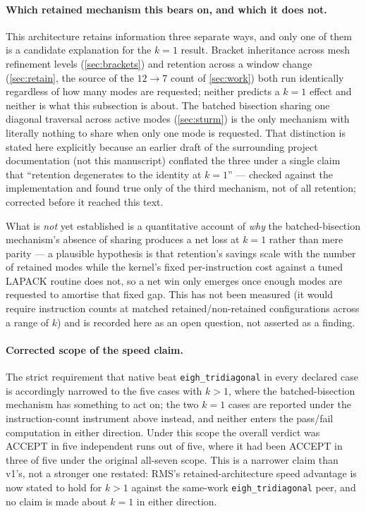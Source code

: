 \documentclass[twocolumn,10pt,a4paper]{article}
\theoremstyle{plain}
\theoremstyle{definition}
\newcommand{\ACCEPT}{\textsf{ACCEPT}}
\begin{document}
\paragraph{Which retained mechanism this bears on, and which it does not.}
This architecture retains information three separate ways, and only one of
them is a candidate explanation for the $k=1$ result. Bracket inheritance
across mesh refinement levels (\cref{sec:brackets}) and retention across a
window change (\cref{sec:retain}, the source of the $12\to7$ count of
\cref{sec:work}) both run identically regardless of how many modes are
requested; neither predicts a $k=1$ effect and neither is what this
subsection is about. The batched bisection sharing one diagonal traversal
across active modes (\cref{sec:sturm}) is the only mechanism with literally
nothing to share when only one mode is requested. That distinction is stated
here explicitly because an earlier draft of the surrounding project
documentation (not this manuscript) conflated the three under a single
claim that ``retention degenerates to the identity at $k=1$'' --- checked
against the implementation and found true only of the third mechanism, not
of all retention; corrected before it reached this text.

What is \emph{not} yet established is a quantitative account of \emph{why}
the batched-bisection mechanism's absence of sharing produces a net loss at
$k=1$ rather than mere parity --- a plausible hypothesis is that retention's
savings scale with the number of retained modes while the kernel's
fixed per-instruction cost against a tuned LAPACK routine does not, so a net
win only emerges once enough modes are requested to amortise that fixed gap.
This has not been measured (it would require instruction counts at matched
retained/non-retained configurations across a range of $k$) and is recorded
here as an open question, not asserted as a finding.

\paragraph{Corrected scope of the speed claim.}
The strict requirement that native beat \texttt{eigh\_tridiagonal} in every
declared case is accordingly narrowed to the five cases with $k>1$, where the
batched-bisection mechanism has something to act on; the two $k=1$ cases are
reported under the instruction-count instrument above instead, and neither
enters the pass/fail computation in either direction. Under this scope the
overall verdict was \ACCEPT{} in five independent runs out of five, where it
had been \ACCEPT{} in three of five under the original all-seven scope. This
is a narrower claim than v1's, not a stronger one restated: RMS's
retained-architecture speed advantage is now stated to hold for $k>1$
against the same-work \texttt{eigh\_tridiagonal} peer, and no claim is made
about $k=1$ in either direction.
\end{document}
